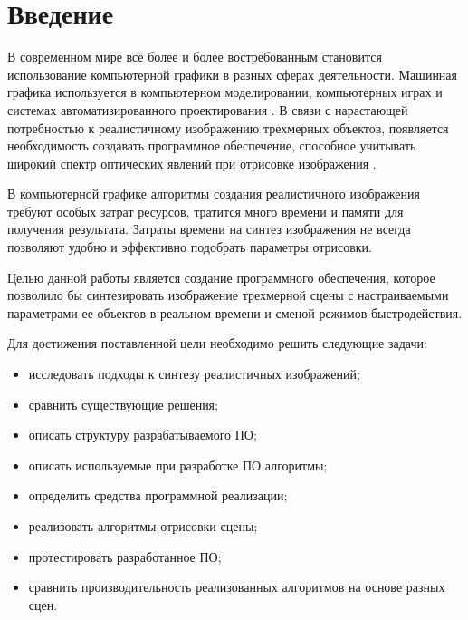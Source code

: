 \chapter*{Введение}

В современном мире всё более и более востребованным становится использование компьютерной графики в разных сферах деятельности. Машинная графика используется в компьютерном моделировании, компьютерных играх и системах автоматизированного проектирования \cite{cad}. В связи с нарастающей потребностью к реалистичному изображению трехмерных объектов, появляется необходимость создавать программное обеспечение, способное учитывать широкий спектр оптических явлений при отрисовке изображения \cite{optics}.

В компьютерной графике алгоритмы создания реалистичного изображения требуют особых затрат ресурсов, тратится много времени и памяти для получения результата. Затраты времени на синтез изображения не всегда позволяют удобно и эффективно подобрать параметры отрисовки.

Целью данной работы является создание программного обеспечения, которое позволило бы синтезировать изображение трехмерной сцены с настраиваемыми параметрами ее объектов в реальном времени и сменой режимов быстродействия.

Для достижения поставленной цели необходимо решить следующие задачи:

\begin{itemize}
    \item исследовать подходы к синтезу реалистичных изображений;
    \item сравнить существующие решения;
    \item описать структуру разрабатываемого ПО;
    \item описать используемые при разработке ПО алгоритмы;
    \item определить средства программной реализации;
    \item реализовать алгоритмы отрисовки сцены;
    \item протестировать разработанное ПО;
    \item сравнить производительность реализованных алгоритмов на основе разных сцен.
\end{itemize}